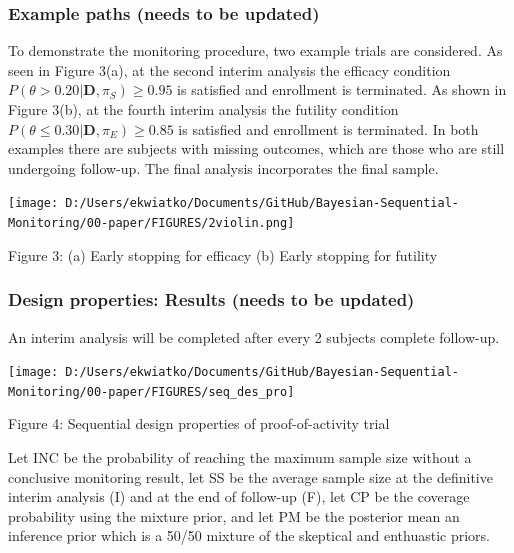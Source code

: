 \documentclass[12pt]{article}
\begin{document}
\subsubsection{Example paths (needs to be updated)}
To demonstrate the monitoring procedure, two example trials are considered. As seen in Figure 3(a), at the second interim analysis the efficacy condition $P(\theta>0.20|\mathbf{D},\pi_S)\geq 0.95$ is satisfied and enrollment is terminated. As shown in Figure 3(b), at the fourth interim analysis the futility condition $P(\theta\leq 0.30|\mathbf{D},\pi_E)\geq 0.85$ is satisfied and enrollment is terminated. In both examples there are subjects with missing outcomes, which are those who are still undergoing follow-up. The final analysis incorporates the final sample.
\begin{center}
\texttt{[image: D:/Users/ekwiatko/Documents/GitHub/Bayesian-Sequential-Monitoring/00-paper/FIGURES/2violin.png]}

Figure 3: (a) Early stopping for efficacy (b) Early stopping for futility
\end{center}
\subsubsection{Design properties: Results (needs to be updated)}
An interim analysis will be completed after every 2 subjects complete follow-up.
\begin{center}
\texttt{[image: D:/Users/ekwiatko/Documents/GitHub/Bayesian-Sequential-Monitoring/00-paper/FIGURES/seq\_des\_pro]}

Figure 4: Sequential design properties of proof-of-activity trial
\end{center}
Let INC be the probability of reaching the maximum sample size without a conclusive monitoring result, let SS be the average sample size at the definitive interim analysis (I) and at the end of follow-up (F), let CP be the coverage probability using the mixture prior, and let PM be the posterior mean an inference prior which is a 50/50 mixture of the skeptical and enthuastic priors.
\end{document}
